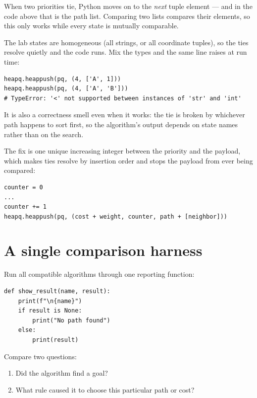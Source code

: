 \begin{pitfall}
When two priorities tie, Python moves on to the \emph{next} tuple element --- and in the code above that is the path list. Comparing two lists compares their elements, so this only works while every state is mutually comparable.

The lab states are homogeneous (all strings, or all coordinate tuples), so the ties resolve quietly and the code runs. Mix the types and the same line raises at run time:

\begin{lstlisting}[style=mlpython]
heapq.heappush(pq, (4, ['A', 1]))
heapq.heappush(pq, (4, ['A', 'B']))
# TypeError: '<' not supported between instances of 'str' and 'int'
\end{lstlisting}

It is also a correctness smell even when it works: the tie is broken by whichever path happens to sort first, so the algorithm's output depends on state names rather than on the search.

The fix is one unique increasing integer between the priority and the payload, which makes ties resolve by insertion order and stops the payload from ever being compared:

\begin{lstlisting}[style=mlpython]
counter = 0
...
counter += 1
heapq.heappush(pq, (cost + weight, counter, path + [neighbor]))
\end{lstlisting}
\end{pitfall}

\section{A single comparison harness}

Run all compatible algorithms through one reporting function:

\begin{lstlisting}[style=mlpython]
def show_result(name, result):
    print(f"\n{name}")
    if result is None:
        print("No path found")
    else:
        print(result)
\end{lstlisting}

Compare two questions:
\begin{enumerate}
  \item Did the algorithm find a goal?
  \item What rule caused it to choose this particular path or cost?
\end{enumerate}

